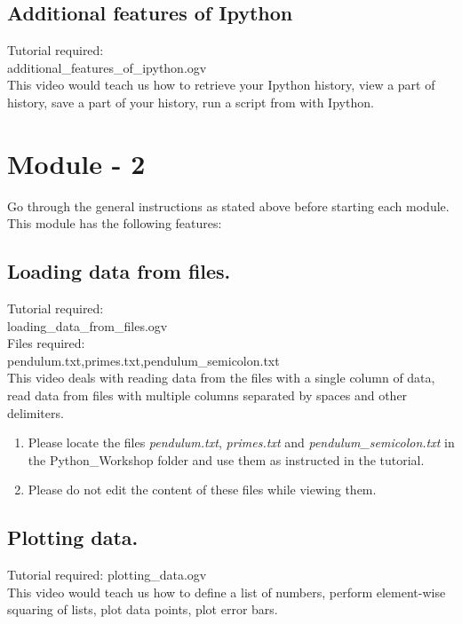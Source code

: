 \documentclass[11pt,twocolumn]{article}
\newenvironment{enumcpt}{\begin{enumerate} \topsep 0pt \partopsep 0pt 
                        \parsep 0pt
                        \itemsep 0pt \leftmargin -1in \rightmargin 0pt
                        }{\end{enumerate}}
\begin{document}
    \subsection{Additional features of Ipython}
     Tutorial required: \\additional\_features\_of\_ipython.ogv \\
    This video would teach us how to retrieve your Ipython history, view a part of history, save a part of your history, run a script from with Ipython. \\

\section{Module - 2}
Go through the general instructions as stated above before starting each module.\\
This module has the following features:
  \subsection{Loading data from files.}
  Tutorial required: \\loading\_data\_from\_files.ogv \\
  Files required:\\ pendulum.txt,primes.txt,pendulum\_semicolon.txt \\
  This video deals with reading data from the files with a single column of data, read data from files with multiple columns separated by spaces and other delimiters. 
\begin{enumcpt}
\item Please locate the files \emph{pendulum.txt}, \emph{primes.txt} and \emph{pendulum\_semicolon.txt} in the Python\_Workshop folder and use them
      as instructed in the tutorial.
\item Please do not edit the content of these files while viewing them.
\end{enumcpt}

  \subsection{Plotting data.}
  Tutorial required: plotting\_data.ogv \\
    This video would teach us how to define a list of numbers, perform element-wise squaring of lists, plot data points, plot error bars. 
\end{document}

